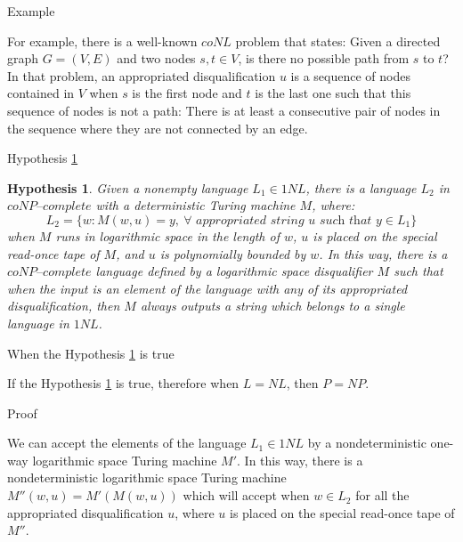 \documentclass[11pt]{beamer}
\newtheorem{hypothesis}[theorem]{Hypothesis}
\begin{document}
\begin{frame}{Example}

For example, there is a well-known $coNL$ problem that states: Given a directed graph $G = (V, E)$ and two nodes $s, t \in V$, is there no possible path from $s$ to $t$? In that problem, an appropriated disqualification $u$ is a sequence of nodes contained in $V$ when $s$ is the first node and $t$ is the last one such that this sequence of nodes is not a path: There is at least a consecutive pair of nodes in the sequence where they are not connected by an edge.

\end{frame}

\begin{frame}{Hypothesis \ref{hypothesis2}}

\begin{hypothesis}
\label{hypothesis2}
Given a nonempty language $L_{1} \in 1NL$, there is a language $L_{2}$ in $\textit{coNP--complete}$ with a deterministic Turing machine $M$, where:
\[L_{2} = \{w: M(w, u) = y, \ \forall \textit{ appropriated string } u \textit{ such that } y \in L_{1}\}\]
when $M$ runs in logarithmic space in the length of $w$, $u$ is placed on the special read-once tape of $M$, and $u$ is polynomially bounded by $w$. In this way, there is a $\textit{coNP--complete}$ language defined by a logarithmic space disqualifier $M$ such that when the input is an element of the language with any of its appropriated disqualification, then $M$ always outputs a string which belongs to a single language in $1NL$.
\end{hypothesis}

\end{frame}

\begin{frame}{When the Hypothesis \ref{hypothesis2} is true}

\begin{theorem}
\label{pos-implication}
If the Hypothesis \ref{hypothesis2} is true, therefore when $L = NL$, then $P = NP$.
\end{theorem}

\end{frame}

\begin{frame}{Proof}

We can accept the elements of the language $L_{1} \in 1NL$ by a nondeterministic one-way logarithmic space Turing machine $M'$. In this way, there is a nondeterministic logarithmic space Turing machine $M''(w, u) = M'(M(w, u))$ which will accept when $w \in L_{2}$ for all the appropriated disqualification $u$, where $u$ is placed on the special read-once tape of $M''$.

\end{frame}
\end{document}
